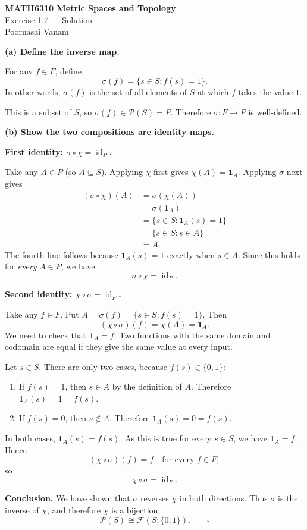 \documentclass[11pt,a4paper]{article}
\begin{document}
\begin{center}
{\Large\bfseries MATH6310 Metric Spaces and Topology}\\[3pt]
{\large Exercise 1.7 --- Solution}\\[5pt]
{\normalsize Poornasai Vanam}
\end{center}

\textbf{(a) Define the inverse map.}

For any $f\in F$, define
\[
\boxed{\sigma(f)=\{s\in S:f(s)=1\}.}
\]
In other words, $\sigma(f)$ is the set of all elements of $S$ at which $f$ takes the value $1$.

This is a subset of $S$, so $\sigma(f)\in\mathcal P(S)=P$. Therefore $\sigma:F\to P$ is well-defined.

\textbf{(b) Show the two compositions are identity maps.}

\textbf{First identity: $\sigma\circ\chi=\operatorname{id}_P$.}

Take any $A\in P$ (so $A\subseteq S$). Applying $\chi$ first gives $\chi(A)=\mathbf 1_A$. Applying $\sigma$ next gives
\begin{align*}
(\sigma\circ\chi)(A)
  &=\sigma(\chi(A))\\
  &=\sigma(\mathbf 1_A)\\
  &=\{s\in S:\mathbf 1_A(s)=1\}\\
  &=\{s\in S:s\in A\}\\
  &=A.
\end{align*}
The fourth line follows because $\mathbf 1_A(s)=1$ exactly when $s\in A$.
Since this holds for \emph{every} $A\in P$, we have
\[
\boxed{\sigma\circ\chi=\operatorname{id}_P.}
\]

\textbf{Second identity: $\chi\circ\sigma=\operatorname{id}_F$.}

Take any $f\in F$. Put $A=\sigma(f)=\{s\in S:f(s)=1\}$.
Then
\[
(\chi\circ\sigma)(f)=\chi(A)=\mathbf 1_A.
\]
We need to check that $\mathbf 1_A=f$. Two functions with the same domain and codomain are equal if they give the same value at every input.

Let $s\in S$. There are only two cases, because $f(s)\in\{0,1\}$:
\begin{enumerate}[label=\textbf{Case \arabic*:},leftmargin=*,itemsep=1pt]
\item If $f(s)=1$, then $s\in A$ by the definition of $A$. Therefore $\mathbf 1_A(s)=1=f(s)$.
\item If $f(s)=0$, then $s\notin A$. Therefore $\mathbf 1_A(s)=0=f(s)$.
\end{enumerate}
In both cases, $\mathbf 1_A(s)=f(s)$. As this is true for every $s\in S$, we have $\mathbf 1_A=f$. Hence
\[
(\chi\circ\sigma)(f)=f
\quad\text{for every }f\in F,
\]
so
\[
\boxed{\chi\circ\sigma=\operatorname{id}_F.}
\]

\textbf{Conclusion.} We have shown that $\sigma$ reverses $\chi$ in both directions. Thus $\sigma$ is the inverse of $\chi$, and therefore $\chi$ is a bijection:
\[
\boxed{\mathcal P(S)\cong\mathcal F(S;\{0,1\}).}\qquad\square
\]
\end{document}
